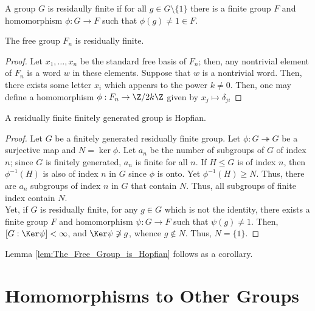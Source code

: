 \documentclass[12pt]{article}
\begin{document}
\begin{definition}\label{def:Residually_Finite}
    A group $G$ is residaully finite if for all $g \in G \setminus \{1\}$ there is a finite group $F$ and homomorphism $\phi: G \rightarrow F$ such that $\phi(g) \neq 1 \in F$.
\end{definition}

\begin{lemma}\label{lem:The_Free_Group_is_Residually_Finite}
    The free group $F_n$ is residually finite.
\end{lemma}
\begin{proof}
    Let $x_1, \ldots, x_n$ be the standard free basis of $F_n$; then, any nontrivial element of $F_n$ is a word $w$ in these elements. 
    Suppose that $w$ is a nontrivial word. Then, there exists some letter $x_i$ which appears to the power $k \neq 0$. Then, one may define a homomorphism $\phi: F_n \rightarrow \Z/2k\Z$ given by $x_j \mapsto \delta_{ji}$
\end{proof}

\begin{proposition}\label{prop:Residaully_Finite_is_Hopfian}
    A residually finite finitely generated group is Hopfian.
\end{proposition}
\begin{proof}
    Let $G$ be a finitely generated residually finite group. Let $\phi: G \twoheadrightarrow G$ be a surjective map and $N = \ker \phi$. Let $a_n$ be the number of subgroups of $G$ of index $n$; since $G$ is finitely generated, $a_n$ is finite for all $n$. If $H \leq G$ is of index $n$, then $\phi^{-1}(H)$ is also of index $n$ in $G$ since $\phi$ is onto. Yet $\phi^{-1}(H) \geq N$. Thus, there are $a_n$ subgroups of index $n$ in $G$ that contain $N$. Thus, all subgroups of finite index contain $N$.\\

    Yet, if $G$ is residually finite, for any $g \in G$ which is not the identity, there exists a finite group $F$ and homomorphism $\psi: G \rightarrow F$ such that $\psi(g) \neq 1$. Then, $[G: \Ker \psi] < \infty$, and $\Ker \psi \not\ni g$, whence $g \not\in N$. Thus, $N = \{1\}$.
\end{proof}

Lemma \ref{lem:The_Free_Group_is_Hopfian} follows as a corollary.

\section{Homomorphisms to Other Groups}
\end{document}
